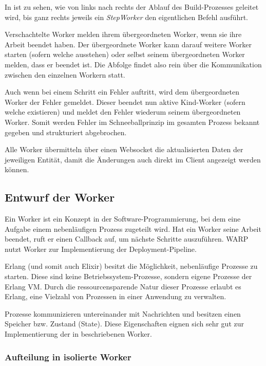 In  ist zu sehen, wie von links nach rechts der Ablauf des Build-Prozesses geleitet wird, bis ganz rechts jeweils ein \emph{StepWorker} den eigentlichen Befehl ausführt.

Verschachtelte Worker melden ihrem übergeordneten Worker, wenn sie ihre Arbeit beendet haben. Der übergeordnete Worker kann darauf weitere Worker starten (sofern welche ausstehen) oder selbst seinem übergeordneten Worker melden, dass er beendet ist. Die Abfolge findet also rein über die Kommunikation zwischen den einzelnen Workern statt.

Auch wenn bei einem Schritt ein Fehler auftritt, wird dem übergeordneten Worker der Fehler gemeldet. Dieser beendet nun aktive Kind-Worker (sofern welche existieren) und meldet den Fehler wiederum seinem übergeordneten Worker. Somit werden Fehler im Schneeballprinzip im gesamten Prozess bekannt gegeben und strukturiert abgebrochen.

Alle Worker übermitteln über einen Websocket die aktualisierten Daten der jeweiligen Entität, damit die Änderungen auch direkt im Client angezeigt werden können.

\subsection{Entwurf der Worker}

Ein Worker ist ein Konzept in der Software-Programmierung, bei dem eine Aufgabe einem nebenläufigen Prozess zugeteilt wird. Hat ein Worker seine Arbeit beendet, ruft er einen Callback auf, um nächste Schritte auszuführen. WARP nutzt Worker zur Implementierung der Deployment-Pipeline.

Erlang (und somit auch Elixir) besitzt die Möglichkeit, nebenläufige Prozesse zu starten. Diese sind keine Betriebssystem-Prozesse, sondern eigene Prozesse der Erlang VM. Durch die ressourcensparende Natur dieser Prozesse erlaubt es Erlang, eine Vielzahl von Prozessen in einer Anwendung zu verwalten. \citep[133]{Armstrong2007}

Prozesse kommunizieren untereinander mit Nachrichten und besitzen einen Speicher bzw. Zustand (State). Diese Eigenschaften eignen sich sehr gut zur Implementierung der in  beschriebenen Worker.

\subsubsection{Aufteilung in isolierte Worker}
\label{subsec:aufteilung-der-worker}

